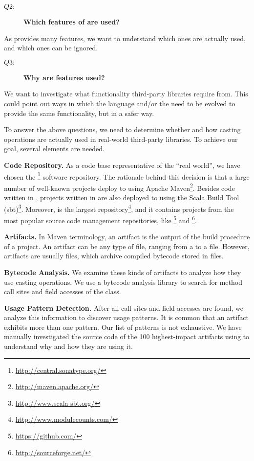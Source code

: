 \begin{description}
\item[{\(Q2:\)}] \textbf{Which features of  are used?}
\end{description}
As provides many features, we want to understand which ones are actually used, and which ones can be ignored. 

\begin{description}
\item[{\(Q3:\)}] \textbf{Why are features used?}
\end{description}
We want to investigate what functionality third-party libraries require from. 
This could point out ways in which the \java{} language and/or the \jvm{} need to be evolved to provide the same functionality, but in a safer way.   

To answer the above questions, we need to determine whether and how casting operations are actually used in real-world third-party \java{} libraries. 
To achieve our goal, several elements are needed. 

\textbf{Code Repository.} 
As a code base representative of the ``real world'', we have chosen the \mavencentral \footnote{\url{http://central.sonatype.org/}} software repository. 
The rationale behind this decision is that a large number of well-known \java{} projects deploy to \mavencentral{} using Apache Maven\footnote{\url{http://maven.apache.org/}}. 
Besides code written in \java{}, projects written in \scala{} are also deployed to \mavencentral{} using the Scala Build Tool (sbt)\footnote{\url{http://www.scala-sbt.org/}}. 
Moreover, \mavencentral{} is the largest \java{} repository\footnote{\url{http://www.modulecounts.com/}}, and it contains projects from the most popular source code management repositories, like \github \footnote{\url{https://github.com/}} and \sourceforge \footnote{\url{http://sourceforge.net/}}. 

\textbf{Artifacts.} 
In Maven terminology, an artifact is the output of the build procedure of a project. 
An artifact can be any type of file, ranging from a  to a  file. 
However, artifacts are usually  files, which archive compiled \java{} bytecode stored in  files. 

\textbf{Bytecode Analysis.} 
We examine these kinds of artifacts to analyze how they use casting operations. 
We use a bytecode analysis library to search for method call sites and field accesses of the \smu{} class. 

\textbf{Usage Pattern Detection.} 
After all call sites and field accesses are found, we analyze this information to discover usage patterns. 
It is common that an artifact exhibits more than one pattern. 
Our list of patterns is not exhaustive.  
We have manually investigated the source code of the 100 highest-impact artifacts using \smu{} to understand why and how they are using it. 

